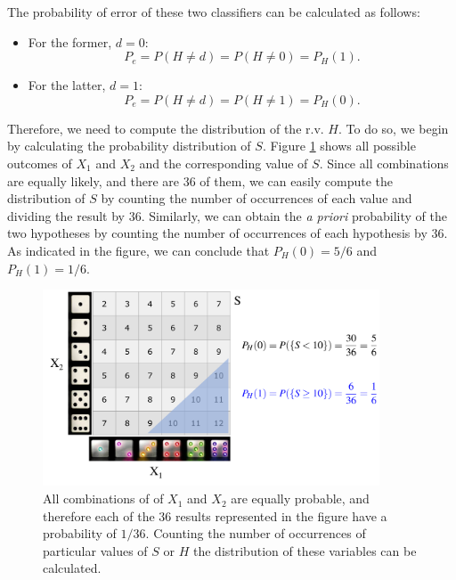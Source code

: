 \begin{solution}
\begin{itemize}
    The probability of error of these two classifiers can be calculated as follows:
    \begin{itemize}
        \item For the former, $d=0$:
        $$P_e = P(H\neq d) = P(H \neq 0) = P_H(1).$$
        \item For the latter, $d=1$:
        $$P_e = P(H\neq d) = P(H \neq 1) = P_H(0).$$
    \end{itemize}

    Therefore, we need to compute the distribution of the r.v. $H$. To do so, we begin by calculating the probability distribution of $S$. Figure \ref{fig:dice} shows all possible outcomes of $X_1$ and $X_2$ and the corresponding value of $S$. Since all combinations are equally likely, and there are $36$ of them, we can easily compute the distribution of $S$ by counting the number of occurrences of each value and dividing the result by $36$. Similarly, we can obtain the {\em a priori} probability of the two hypotheses by counting the number of occurrences of each hypothesis by 36. As indicated in the figure, we can conclude that $P_H(0) = 5/6$ and $P_H(1) = 1/6$.
    
    \begin{figure}
        \begin{center}
            \includegraphics[width=10cm]{Figures/Dice.png}
        \end{center}
        \caption{All combinations of of $X_1$ and $X_2$ are equally probable, and therefore each of the $36$ results represented in the figure have a probability of $1/36$. Counting the number of occurrences of particular values of $S$ or $H$ the distribution of these variables can be calculated.\label{fig:dice}}
    \end{figure}
    

\end{itemize}
\end{solution}
